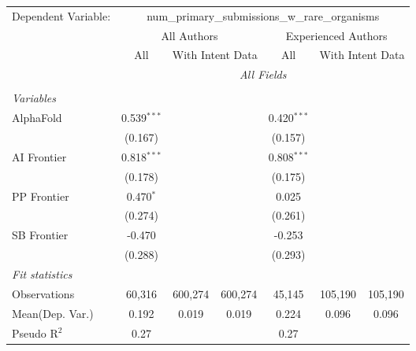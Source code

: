 \begingroup
\centering
\begin{tabular}{lcccccc}
   \tabularnewline \midrule \midrule
   Dependent Variable: & \multicolumn{6}{c}{num\_primary\_submissions\_w\_rare\_organisms}\\
 & \multicolumn{3}{c}{All Authors} & \multicolumn{3}{c}{Experienced Authors} \\
\cmidrule(lr){2-4} \cmidrule(lr){5-7}
 & \multicolumn{1}{c}{All} & \multicolumn{2}{c}{With Intent Data} & \multicolumn{1}{c}{All} & \multicolumn{2}{c}{With Intent Data} \\
\cmidrule(lr){2-2} \cmidrule(lr){3-4} \cmidrule(lr){5-5} \cmidrule(lr){6-7}
 & \multicolumn{6}{c}{\textit{All Fields}} \\ \\
   \emph{Variables}\\
   AlphaFold    & 0.539$^{***}$ &         &         & 0.420$^{***}$ &         &   \\   
                & (0.167)       &         &         & (0.157)       &         &   \\   
   AI Frontier  & 0.818$^{***}$ &         &         & 0.808$^{***}$ &         &   \\   
                & (0.178)       &         &         & (0.175)       &         &   \\   
   PP Frontier  & 0.470$^{*}$   &         &         & 0.025         &         &   \\   
                & (0.274)       &         &         & (0.261)       &         &   \\   
   SB Frontier  & -0.470        &         &         & -0.253        &         &   \\   
                & (0.288)       &         &         & (0.293)       &         &   \\   
   \midrule
   \emph{Fit statistics}\\
   Observations & 60,316        & 600,274 & 600,274 & 45,145        & 105,190 & 105,190\\  
Mean(Dep. Var.) & 0.192 & 0.019 & 0.019 & 0.224 & 0.096 & 0.096 \\
   Pseudo R$^2$ & 0.27          &         &         & 0.27          &         & \\  
   

\end{tabular}
